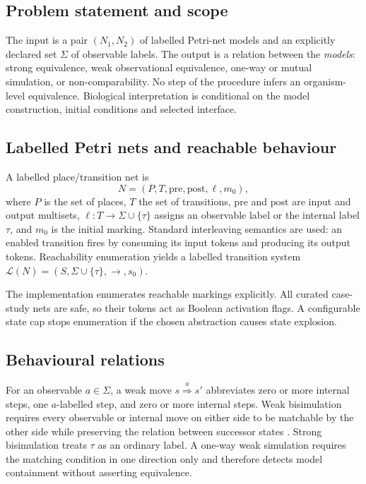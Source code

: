 \documentclass[pdflatex,sn-mathphys-ay]{sn-jnl}
\theoremstyle{definition}
\newcommand{\TAU}{\tau}
\newcommand{\xRightarrow}[1]{\stackrel{#1}{\Longrightarrow}}
\begin{document}
\subsection{Problem statement and scope}\label{sec:problem}

The input is a pair $(N_1,N_2)$ of labelled Petri-net models and an explicitly
declared set $\Sigma$ of observable labels. The output is a relation between the
\emph{models}: strong equivalence, weak observational equivalence, one-way or
mutual simulation, or non-comparability. No step of the procedure infers an
organism-level equivalence. Biological interpretation is conditional on the
model construction, initial conditions and selected interface.

\subsection{Labelled Petri nets and reachable behaviour}\label{sec:petri}

A labelled place/transition net is
\[
N=(P,T,\mathrm{pre},\mathrm{post},\ell,m_0),
\]
where $P$ is the set of places, $T$ the set of transitions,
$\mathrm{pre}$ and $\mathrm{post}$ are input and output multisets,
$\ell:T\rightarrow\Sigma\cup\{\TAU\}$ assigns an observable label or the
internal label $\TAU$, and $m_0$ is the initial marking. Standard interleaving
semantics are used: an enabled transition fires by consuming its input tokens and
producing its output tokens. Reachability enumeration yields a labelled
transition system $\mathcal{L}(N)=(S,\Sigma\cup\{\TAU\},\rightarrow,s_0)$.

The implementation enumerates reachable markings explicitly. All curated case-
study nets are safe, so their tokens act as Boolean activation flags. A configurable
state cap stops enumeration if the chosen abstraction causes state explosion.

\subsection{Behavioural relations}\label{sec:relations}

For an observable $a\in\Sigma$, a weak move
$s\xRightarrow{a}s'$ abbreviates zero or more internal steps, one $a$-labelled
step, and zero or more internal steps. Weak bisimulation requires every observable
or internal move on either side to be matchable by the other side while preserving
the relation between successor states \citep{Milner1989,Sangiorgi2011}. Strong
bisimulation treats $\TAU$ as an ordinary label. A one-way weak simulation requires
the matching condition in one direction only and therefore detects model
containment without asserting equivalence.
\end{document}
